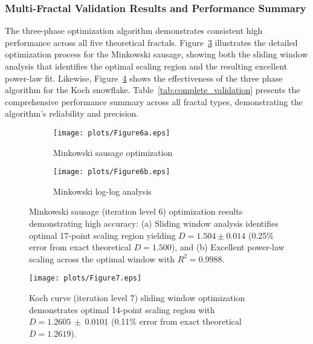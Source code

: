 \documentclass[preprint,12pt]{elsarticle}
\begin{document}
\subsubsection{Multi-Fractal Validation Results and Performance Summary}

The three-phase optimization algorithm demonstrates consistent high performance across all five theoretical fractals. Figure~\ref{fig:minkowski_results} illustrates the detailed optimization process for the Minkowski sausage, showing both the sliding window analysis that identifies the optimal scaling region and the resulting excellent power-law fit. Likewise, Figure~\ref{fig:koch_sliding_window} shows the effectiveness of the three phase algorithm for the Koch snowflake.  Table~\ref{tab:complete_validation} presents the comprehensive performance summary across all fractal types, demonstrating the algorithm's reliability and precision.

\begin{figure}[tbp]
\centering
\begin{subfigure}[b]{0.8\textwidth}
    \centering
    \texttt{[image: plots/Figure6a.eps]}
    \caption{Minkowski sausage optimization}
    \label{fig:minkowski_optimized}
\end{subfigure}

\vspace{0.3cm}

\begin{subfigure}[b]{0.8\textwidth}
    \centering
    \texttt{[image: plots/Figure6b.eps]}
    \caption{Minkowski log-log analysis}
    \label{fig:minkowski_loglog}
\end{subfigure}
\caption{Minkowski sausage (iteration level 6) optimization results demonstrating high accuracy: (a) Sliding window analysis identifies optimal 17-point scaling region yielding $D = 1.504 \pm 0.014$ (0.25\% error from exact theoretical $D = 1.500$), and (b) Excellent power-law scaling across the optimal window with $R^2 = 0.9988$.}
\label{fig:minkowski_results}
\end{figure}

\begin{figure}[tbp]
 \centering
 \texttt{[image: plots/Figure7.eps]}
 \caption{Koch curve (iteration level 7) sliding window optimization demonstrates optimal 14-point scaling region with $D = 1.2605 \ \pm \ 0.0101$ (0.11\% error from exact theoretical $D = 1.2619$).}
 \label{fig:koch_sliding_window}
\end{figure}
\end{document}
